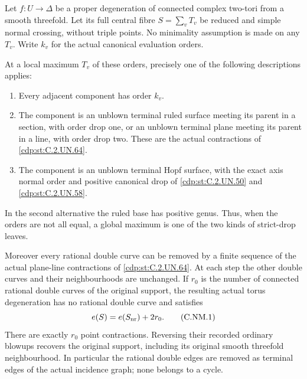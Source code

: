 
\begin{proposition}\label{cdp:st:C.2.UN.69}
Let $f:U\to\Delta$ be a proper degeneration of connected complex
two-tori from a smooth threefold. Let its full central fibre
$S=\sum_vT_v$ be reduced and simple normal crossing, without triple
points. No minimality assumption is made on any $T_v$.
Write $k_v$ for the actual canonical evaluation orders.

At a local maximum $T_v$ of these orders, precisely one of the
following descriptions applies:
\begin{enumerate}
\item Every adjacent component has order $k_v$.
\item The component is an unblown terminal ruled surface meeting
its parent in a section, with order drop one, or an unblown
terminal plane meeting its parent in a line, with order drop two.
These are the actual contractions of \ref{cdp:st:C.2.UN.64}.
\item The component is an unblown terminal Hopf surface, with
the exact axis normal order and positive canonical drop of
\ref{cdp:st:C.2.UN.50} and \ref{cdp:st:C.2.UN.58}.
\end{enumerate}
In the second alternative the ruled base has positive genus.
Thus, when the orders are not all equal, a global maximum is
one of the two kinds of strict-drop leaves.

Moreover every rational double curve can be removed by a finite
sequence of the actual plane-line contractions of \ref{cdp:st:C.2.UN.64}.
At each step the other double curves and their neighbourhoods
are unchanged. If $r_0$ is the number of connected rational
double curves of the original support, the resulting actual
torus degeneration has no rational double curve and satisfies
\[
             e(S)=e(S_{\rm nr})+2r_0 .
\tag{C.NM.1}\label{cdp:eq:C.NM.1}
\]
There are exactly $r_0$ point contractions. Reversing their
recorded ordinary blowups recovers the original support,
including its original smooth threefold neighbourhood.
In particular the rational double edges are removed as terminal
edges of the actual incidence graph; none belongs to a cycle.
\end{proposition}

